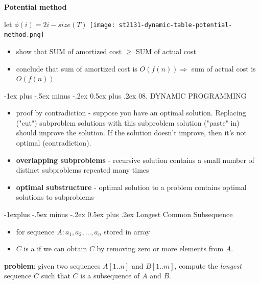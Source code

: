 \documentclass[10pt, landscape]{article}
\makeatletter
\renewcommand{\section}{\@startsection{section}{1}{0mm}%
  {-1ex plus -.5ex minus -.2ex}%
  {0.5ex plus .2ex}%
{\normalfont\large\bfseries}}
\renewcommand{\subsection}{\@startsection{subsection}{2}{0mm}%
  {-1explus -.5ex minus -.2ex}%
  {0.5ex plus .2ex}%
{\normalfont\normalsize\bfseries}}
\makeatother
\begin{document}
\begin{multicols*}{4}
  \textbf{Potential method}

  \begin{tightcenter}
    let $\phi(i) = 2i - size(T)$
    \texttt{[image: st2131-dynamic-table-potential-method.png]} 
  \end{tightcenter}

  \begin{itemize}
    \item show that SUM of amortized cost $\geq$ SUM of actual cost
    \item conclude that sum of amortized cost is $O(f(n)) \Rightarrow$ sum of actual cost is $O(f(n))$
  \end{itemize}


  \section{08. DYNAMIC PROGRAMMING}

  \begin{itemize}
    \item {} proof by contradiction - suppose you have an optimal solution. Replacing ("cut") subproblem solutions with this subproblem solution ("paste" in) should improve the solution. If the solution doesn't improve, then it's not optimal (contradiction).
    \item \textbf{overlapping subproblems} - recursive solution contains a small number of distinct subproblems repeated many times
    \item \textbf{optimal substructure} - optimal solution to a problem contains optimal solutions to subproblems
  \end{itemize}

  \subsection{Longest Common Subsequence}

  \begin{itemize}
    \item for sequence $A: a_1, a_2, \dots, a_n$ stored in array
    \item $C$ is a  if we can obtain $C$ by removing zero or more elements from $A$.
  \end{itemize}

  \textbf{problem}: given two sequences $A[1..n]$ and $B[1..m]$, compute the \textit{longest} sequence $C$ such that $C$ is a subsequence of $A$ and $B$.


\end{multicols*}
\end{document}
